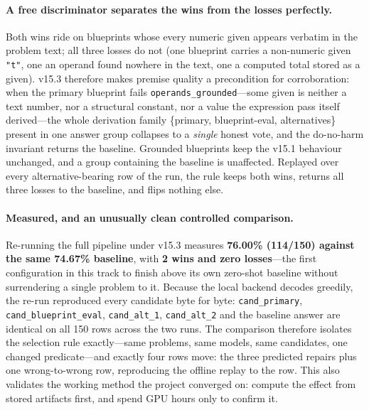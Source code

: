 \documentclass[11pt,a4paper]{article}
\begin{document}
\paragraph{A free discriminator separates the wins from the losses perfectly.}
Both wins ride on blueprints whose every numeric given appears verbatim in the problem text; all three losses do not (one blueprint carries a non-numeric given \texttt{"t"}, one an operand found nowhere in the text, one a computed total stored as a given).
v15.3 therefore makes premise quality a precondition for corroboration: when the primary blueprint fails \texttt{operands\_grounded}---some given is neither a text number, nor a structural constant, nor a value the expression pass itself derived---the whole derivation family \{primary, blueprint-eval, alternatives\} present in one answer group collapses to a \emph{single} honest vote, and the do-no-harm invariant returns the baseline.
Grounded blueprints keep the v15.1 behaviour unchanged, and a group containing the baseline is unaffected.
Replayed over every alternative-bearing row of the run, the rule keeps both wins, returns all three losses to the baseline, and flips nothing else.

\paragraph{Measured, and an unusually clean controlled comparison.}
Re-running the full pipeline under v15.3 measures \textbf{76.00\% (114/150) against the same 74.67\% baseline}, with \textbf{2 wins and zero losses}---the first configuration in this track to finish above its own zero-shot baseline without surrendering a single problem to it.
Because the local backend decodes greedily, the re-run reproduced every candidate byte for byte: \texttt{cand\_primary}, \texttt{cand\_blueprint\_eval}, \texttt{cand\_alt\_1}, \texttt{cand\_alt\_2} and the baseline answer are identical on all 150 rows across the two runs.
The comparison therefore isolates the selection rule exactly---same problems, same models, same candidates, one changed predicate---and exactly four rows move: the three predicted repairs plus one wrong-to-wrong row, reproducing the offline replay to the row.
This also validates the working method the project converged on: compute the effect from stored artifacts first, and spend GPU hours only to confirm it.
\end{document}

